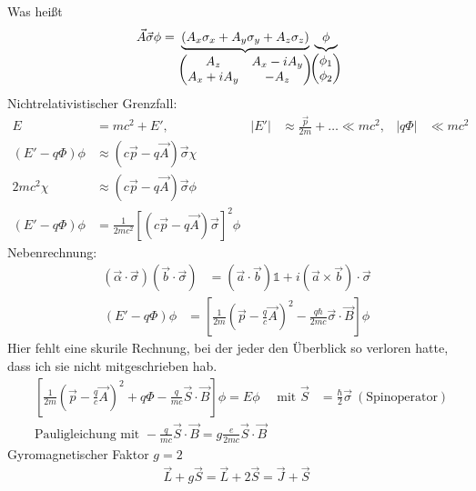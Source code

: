 Was heißt
	\begin{align*}
		\vec{A} \vec{\sigma} \phi =
		\underbrace{
				\left(A_x\sigma_x + A_y\sigma_y + A_z\sigma_z\right)
			}_{\substack{
					\begin{pmatrix}
						A_z & A_x - iA_y \\
						A_x + iA_y & -A_z
					\end{pmatrix}
				}}
		\underbrace{\phi}_{\mathclap{
					\begin{pmatrix}
						\phi_1 \\ \phi_2
					\end{pmatrix}
				}}
	\end{align*}
Nichtrelativistischer Grenzfall:
	\begin{align*}
		E &= mc^2 + E' ,& 
		|E'| &\approx \frac{\vec{p}}{2m} + \ldots \ll mc^2 ,&
		|q\Phi| &\ll mc^2 \\
		(E' - q \Phi) \phi &\approx (c \vec{p} - q \vec{A}) \vec{\sigma} \chi \\
		2mc^2 \chi &\approx (c \vec{p} - q \vec{A}) \vec{\sigma} \phi \\
		(E' - q\Phi) \phi &= 
		\frac{1}{2mc^2} \left[(c \vec{p} - q \vec{A}) \vec{\sigma}\right]^2 \phi  
	\end{align*}
Nebenrechnung:
	\begin{align*}
		(\vec{\alpha} \cdot \vec{\sigma}) (\vec{b} \cdot \vec{\sigma}) 
		&= (\vec{a} \cdot \vec{b}) \mathds{1} + i (\vec{a} \times \vec{b}) \cdot \vec{\sigma}
	\end{align*}
	\begin{align*}
		(E'- q\Phi) \phi &=
		\left[\frac{1}{2m} (\vec{p} - \frac{q}{c} \vec{A})^2 - \frac{q \hbar}{2mc} \vec{\sigma} \cdot \vec{B}\right] \phi
	\end{align*}
Hier fehlt eine skurile Rechnung, bei der jeder den Überblick so verloren hatte, dass ich sie nicht mitgeschrieben hab.
	\begin{align*}
		&\boxed{\left[
			\frac{1}{2m} (\vec{p} - \frac{q}{c} \vec{A})^2 + q\Phi -\frac{q}{mc} \vec{S} \cdot \vec{B}
		\right] \phi
		= E\phi}
		&\text{mit }
		\vec{S} &= \frac{\hbar}{2} \vec{\sigma} ~(\text{Spinoperator}) \\
		&\text{Pauligleichung mit }
		-\frac{q}{mc} \vec{S} \cdot \vec{B} = g \frac{e}{2mc} \vec{S} \cdot \vec{B}
	\end{align*}
Gyromagnetischer Faktor $g=2$
	\begin{align*}
		\vec{L} + g \vec{S} = \vec{L} + 2\vec{S} = \vec{J} + \vec{S}
	\end{align*}
